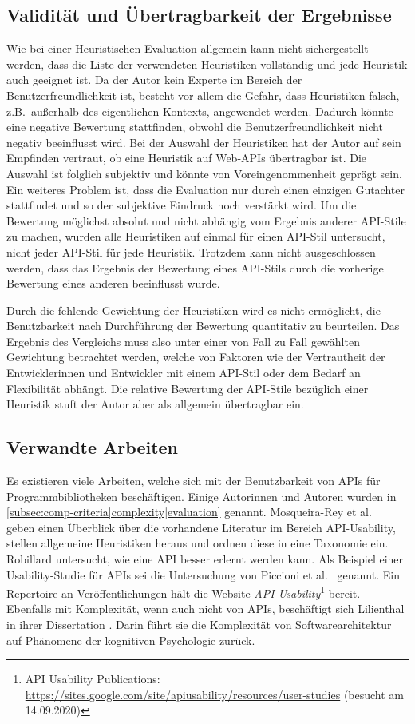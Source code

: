 \subsection{Validität und Übertragbarkeit der Ergebnisse}
Wie bei einer Heuristischen Evaluation allgemein kann nicht sichergestellt werden, dass die Liste der verwendeten Heuristiken vollständig und jede Heuristik auch geeignet ist. Da der Autor kein Experte im Bereich der Benutzerfreundlichkeit ist, besteht vor allem die Gefahr, dass Heuristiken falsch, z.B.\ außerhalb des eigentlichen Kontexts, angewendet werden. Dadurch könnte eine negative Bewertung stattfinden, obwohl die Benutzerfreundlichkeit nicht negativ beeinflusst wird. Bei der Auswahl der Heuristiken hat der Autor auf sein Empfinden vertraut, ob eine Heuristik auf Web-APIs übertragbar ist. Die Auswahl ist folglich subjektiv und könnte von Voreingenommenheit geprägt sein. Ein weiteres Problem ist, dass die Evaluation nur durch einen einzigen Gutachter stattfindet und so der subjektive Eindruck noch verstärkt wird. Um die Bewertung möglichst absolut und nicht abhängig vom Ergebnis anderer API-Stile zu machen, wurden alle Heuristiken auf einmal für einen API-Stil untersucht, nicht jeder API-Stil für jede Heuristik. Trotzdem kann nicht ausgeschlossen werden, dass das Ergebnis der Bewertung eines API-Stils durch die vorherige Bewertung eines anderen beeinflusst wurde.

Durch die fehlende Gewichtung der Heuristiken wird es nicht ermöglicht, die Benutzbarkeit nach Durchführung der Bewertung quantitativ zu beurteilen. Das Ergebnis des Vergleichs muss also unter einer von Fall zu Fall gewählten Gewichtung betrachtet werden, welche von Faktoren wie der Vertrautheit der Entwicklerinnen und Entwickler mit einem API-Stil oder dem Bedarf an Flexibilität abhängt. Die relative Bewertung der API-Stile bezüglich einer Heuristik stuft der Autor aber als allgemein übertragbar ein.

\subsection{Verwandte Arbeiten}
Es existieren viele Arbeiten, welche sich mit der Benutzbarkeit von APIs für Programmbibliotheken beschäftigen. Einige Autorinnen und Autoren wurden in \cref{subsec:comp-criteria|complexity|evaluation} genannt. Mosqueira-Rey et al.\ \autocite{MosqueiraRey2018} geben einen Überblick über die vorhandene Literatur im Bereich API-Usability, stellen allgemeine Heuristiken heraus und ordnen diese in eine Taxonomie ein. Robillard \autocite{Robillard2009} untersucht, wie eine API besser erlernt werden kann. Als Beispiel einer Usability-Studie für APIs sei die Untersuchung von Piccioni et al.\ \autocite{Piccioni2013} genannt. Ein Repertoire an Veröffentlichungen hält die Website \textit{API Usability}\footnote{API Usability \textendash{} Publications: \url{https://sites.google.com/site/apiusability/resources/user-studies} (besucht am 14.09.2020)} bereit. Ebenfalls mit Komplexität, wenn auch nicht von APIs, beschäftigt sich Lilienthal in ihrer Dissertation \autocite{Lilienthal2008}. Darin führt sie die Komplexität von Softwarearchitektur auf Phänomene der kognitiven Psychologie zurück.

